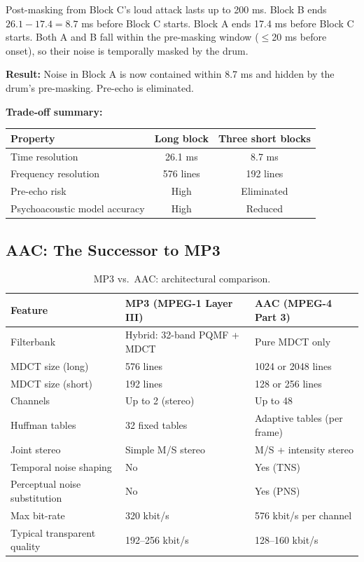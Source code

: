\begin{examplebox}
Post-masking from Block C's loud attack lasts up to 200 ms. Block B ends $26.1 - 17.4 = 8.7$ ms before Block C starts. Block A ends 17.4 ms before Block C starts. Both A and B fall within the pre-masking window ($\leq$20 ms before onset), so their noise is temporally masked by the drum.

\medskip
\noindent\textbf{Result:} Noise in Block A is now contained within 8.7 ms and hidden by the drum's pre-masking. Pre-echo is eliminated.

\medskip
\noindent\textbf{Trade-off summary:}
\begin{center}
\begin{tabular}{lcc}
\toprule
Property & Long block & Three short blocks \\
\midrule
Time resolution & 26.1 ms & 8.7 ms \\
Frequency resolution & 576 lines & 192 lines \\
Pre-echo risk & High & Eliminated \\
Psychoacoustic model accuracy & High & Reduced \\
\bottomrule
\end{tabular}
\end{center}
\end{examplebox}

\subsection{AAC: The Successor to MP3}

\begin{table}[H]
\centering
\caption{MP3 vs.\ AAC: architectural comparison.}
\label{tab:mp3vsaac}
\setlength{\tabcolsep}{5pt}
\begin{tabular}{lll}
\toprule
\textbf{Feature} & \textbf{MP3 (MPEG-1 Layer III)} & \textbf{AAC (MPEG-4 Part 3)} \\
\midrule
Filterbank & Hybrid: 32-band PQMF + MDCT & Pure MDCT only \\
MDCT size (long) & 576 lines & 1024 or 2048 lines \\
MDCT size (short) & 192 lines & 128 or 256 lines \\
Channels & Up to 2 (stereo) & Up to 48 \\
Huffman tables & 32 fixed tables & Adaptive tables (per frame) \\
Joint stereo & Simple M/S stereo & M/S + intensity stereo \\
Temporal noise shaping & No & Yes (TNS) \\
Perceptual noise substitution & No & Yes (PNS) \\
Max bit-rate & 320 kbit/s & 576 kbit/s per channel \\
Typical transparent quality & 192--256 kbit/s & 128--160 kbit/s \\
\bottomrule
\end{tabular}
\end{table}

